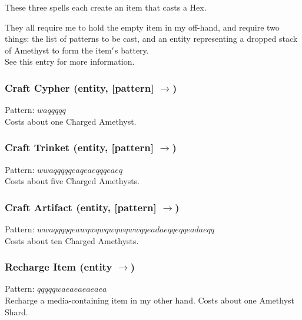 \documentclass[12pt]{article}
\begin{document}
  
    These three spells each create an item that casts a Hex.

They all require me to hold the empty item in my off-hand, and require two things: the list of patterns to be cast, and an entity representing a dropped stack of Amethyst to form the item$\rq$s battery.\\See this entry for more information.\\


  \label{sec: patterns/spells/hexcasting@hexcasting:craft/cypher}
\subsubsection*{Craft Cypher (entity, [pattern] $\rightarrow$)}

    Pattern: $waqqqqq$\\
      Costs about one Charged Amethyst.\\


  \label{sec: patterns/spells/hexcasting@hexcasting:craft/trinket}
\subsubsection*{Craft Trinket (entity, [pattern] $\rightarrow$)}

    Pattern: $wwaqqqqqeaqeaeqqqeaeq$\\
      Costs about five Charged Amethysts.\\


  \label{sec: patterns/spells/hexcasting@hexcasting:craft/artifact}
\subsubsection*{Craft Artifact (entity, [pattern] $\rightarrow$)}

    Pattern: $wwaqqqqqeawqwqwqwqwqwwqqeadaeqqeqqeadaeqq$\\
      Costs about ten Charged Amethysts.\\


  \label{sec: patterns/spells/hexcasting@hexcasting:recharge}
\subsubsection*{Recharge Item (entity $\rightarrow$)}

    Pattern: $qqqqqwaeaeaeaeaea$\\
      Recharge a media-containing item in my other hand. Costs about one Amethyst Shard.\\
\end{document}
